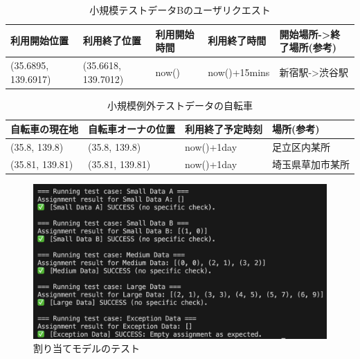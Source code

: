           \begin{table}[t]
            \caption{小規模テストデータBのユーザリクエスト}
            \label{tab:小規模テストデータBのユーザリクエスト}
            \centering
            \begin{tabular}{|l|l|l|l|l|} \hline
              利用開始位置 & 利用終了位置 & 利用開始時間 & 利用終了時間 & 開始場所->終了場所(参考) \\ \hline
              (35.6895, 139.6917) & (35.6618, 139.7012) & now() & now()+15mins & 新宿駅->渋谷駅 \\ \hline
            \end{tabular}
          \end{table}

          \begin{table}[t]
            \caption{小規模例外テストデータの自転車}
            \label{tab:小規模例外テストデータの自転車}
            \centering
            \begin{tabular}{|l|l|l|l|} \hline
              自転車の現在地 & 自転車オーナの位置 & 利用終了予定時刻 & 場所(参考) \\ \hline
              (35.8, 139.8) & (35.8, 139.8) & now()+1day & 足立区内某所 \\
              (35.81, 139.81) & (35.81, 139.81) & now()+1day & 埼玉県草加市某所 \\ \hline
            \end{tabular}
          \end{table}

          \begin{figure}[htbp]
            \centering
            \includegraphics[scale=0.29]
            {figures/TestResult.png}
            \caption{割り当てモデルのテスト}
            \label{fig:割り当てモデルのテスト}
          \end{figure}

